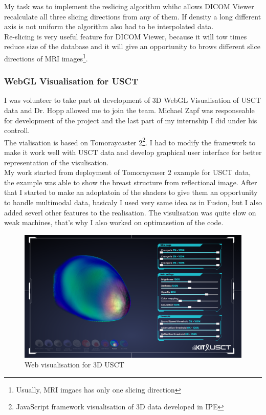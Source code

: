 \documentclass[english]{article}
\begin{document}
My task was to implement the reslicing algorithm whihc allows DICOM Viewer recalculate all three slicing directions from any of them. If density a long different axis is not uniform the algorithm also had to be interpolated data.\\

Re-slicing is very useful feature for DICOM Viewer, because it will tow times reduce size of the database and it will give an opportunity to brows different slice directions of MRI images\footnote{Usually, MRI imgaes has only one slicing direction}.\\

\subsubsection{WebGL Visualisation for USCT}

I was volunteer to take part at development of 3D WebGL Visualisation of USCT data and Dr. Hopp allowed me to join the team. Michael Zapf was responseable for development of the project and the last part of my internship I did under his controll.\\

The vialisation is based on Tomoraycaster 2\footnote{JavaScript framework visualisation of 3D data developed in IPE}. I had to modify the framework to make it work well with USCT data and develop graphical user interface for better representation of the  visulisation.\\

My work started from deployment of Tomoraycaser 2 example for USCT data, the example was able to show the breast structure from reflectional image. After that I started to make an adoptatoin of the shaders to give them an opportunity to handle multimodal data, basicaly I used very same idea as in Fusion, but I also added severl other features to the realisation. The visulisation was quite slow on weak machines, that's why I also worked on optimasetion of the code.\\

\begin{figure}[H]
\centerline{\includegraphics[scale=0.4]{internship_report/usct}}
\caption{Web visualisation for 3D USCT\label{fig:usct}}
\end{figure}
\end{document}
